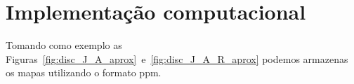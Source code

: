 %
%
%

\section{Implementa\c{c}\~{a}o computacional}
Tomando como exemplo as
Figuras~\ref{fig:disc_J_A_aprox}~e~\ref{fig:disc_J_A_R_aprox} podemos armazenas
os mapas utilizando o formato ppm.
